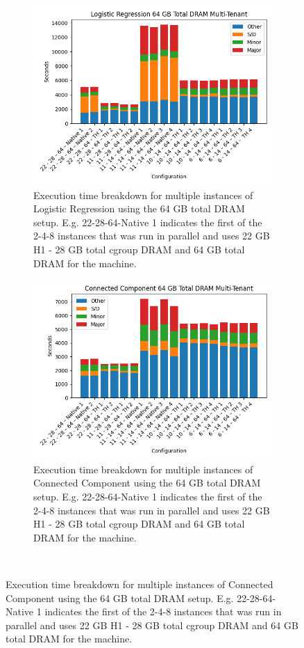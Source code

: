 \begin{figure}[htbp]
	\centering
        \begin{subfigure}[b]{0.48\textwidth}
    \includegraphics[width=\linewidth]{./fig/logr64.png}
    \caption{Execution time breakdown for multiple instances of
    Logistic Regression using the 64 GB total DRAM setup. E.g.
    22-28-64-Native 1 indicates the first of the 2-4-8 instances that
    was run in parallel and uses 22 GB H1 - 28 GB total cgroup DRAM
    and 64 GB total DRAM for the machine.}
    \label{fig:logr64}
\end{subfigure}

\begin{subfigure}[b]{0.48\textwidth}
    \includegraphics[width=\linewidth]{./fig/cc64.png}
    \caption{Execution time breakdown for multiple instances of
    Connected Component using the 64 GB total DRAM setup. E.g.
    22-28-64-Native 1 indicates the first of the 2-4-8 instances that
    was run in parallel and uses 22 GB H1 - 28 GB total cgroup DRAM
    and 64 GB total DRAM for the machine.}
    \label{fig:cc64}
\end{subfigure}\\[1em]
\end{figure}

